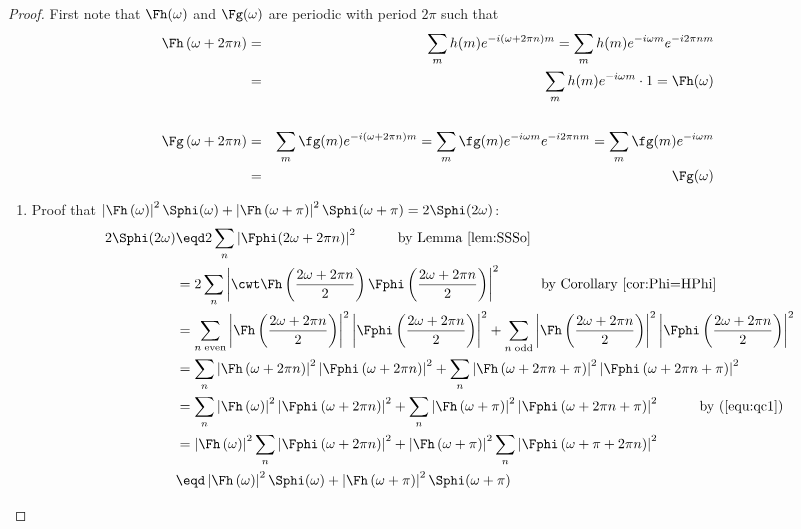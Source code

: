 \begin{proof}
First note that $\Fh(\omega)$ and $\Fg(\omega)$
are periodic with period $2\pi$ such that
\begin{eqnarray}
   \Fh\left(\omega+2\pi n\right)
     &=& \sum_m h(m)e^{-i \left(\omega+2\pi n\right)m}
     = \sum_m h(m)e^{-i\omega m}e^{-i2\pi nm} \nonumber
  \\&=& \sum_m h(m)e^{-i\omega m}\cdot1
     = \Fh(\omega)
     \label{equ:qc1}
\\
\\
   \Fg\left(\omega+2\pi n\right)
     &=& \sum_m \fg(m) e^{-i(\omega+2\pi n)m}
      =  \sum_m \fg(m) e^{-i\omega m} e^{-i2\pi nm}
      =  \sum_m \fg(m) e^{-i\omega m}  \nonumber
  \\&=& \Fg(\omega)
     \label{equ:psi_qc1}
\end{eqnarray}

\begin{enumerate}
\item Proof that
   $
   \left|\Fh\left(\omega     \right)\right|^2 \Sphi(\omega) +
   \left|\Fh\left(\omega+\pi \right)\right|^2 \Sphi(\omega+\pi)
   = 2\Sphi(2\omega)
   $:
\begin{align*}
   2\Sphi(2\omega)
     &\eqd 2\sum_n \left|\Fphi(2\omega+2\pi n)\right|^2
         \hspace{1cm}\text{by Lemma~\ref{lem:SSSo}}
   \\&= 2\sum_n \left|\cwt \Fh\left(\frac{2\omega+2\pi n}{2}\right)\Fphi\left(\frac{2\omega+2\pi n}{2}\right)\right|^2
        \hspace{1cm}\text{by Corollary~\ref{cor:Phi=HPhi}}
   \\&= \sum_{n\;\mathrm{even}} \left|\Fh\left(\frac{2\omega+2\pi n}{2}\right)\right|^2\left|\Fphi\left(\frac{2\omega+2\pi n}{2}\right)\right|^2 +
        \sum_{n\;\mathrm{odd} } \left|\Fh\left(\frac{2\omega+2\pi n}{2}\right)\right|^2\left|\Fphi\left(\frac{2\omega+2\pi n}{2}\right)\right|^2
   \\&= \sum_n \left|\Fh\left(\omega+2\pi n\right)\right|^2\left|\Fphi\left(\omega+2\pi n\right)\right|^2 +
        \sum_n \left|\Fh\left(\omega+2\pi n+\pi \right)\right|^2\left|\Fphi\left(\omega+2\pi n+ \pi \right)\right|^2
   \\&= \sum_n \left|\Fh\left(\omega\right)\right|^2\left|\Fphi\left(\omega+2\pi n\right)\right|^2 +
        \sum_n \left|\Fh\left(\omega+\pi \right)\right|^2\left|\Fphi\left(\omega+2\pi n+ \pi \right)\right|^2
        \hspace{1cm}\text{by (\ref{equ:qc1})}
   \\&= \left|\Fh\left(\omega     \right)\right|^2 \sum_n \left|\Fphi\left(\omega    +2\pi n\right)\right|^2 +
        \left|\Fh\left(\omega+\pi \right)\right|^2 \sum_n \left|\Fphi\left(\omega+\pi+2\pi n\right)\right|^2
   \\&\eqd \left|\Fh\left(\omega     \right)\right|^2 \Sphi(\omega) +
         \left|\Fh\left(\omega+\pi \right)\right|^2 \Sphi(\omega+\pi)
\end{align*}


\end{enumerate}
\end{proof}
